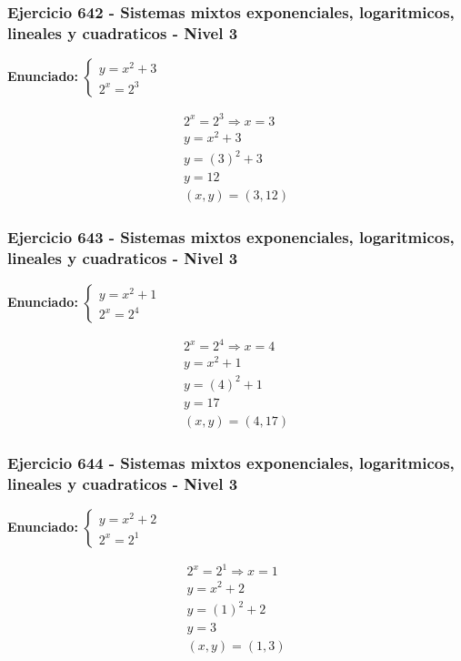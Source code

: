 \documentclass[12pt,a4paper]{article}
\begin{document}
\subsubsection*{Ejercicio 642 - Sistemas mixtos exponenciales, logaritmicos, lineales y cuadraticos - Nivel 3}
\textbf{Enunciado:} \(\begin{cases} y=x^2+3\\ 2^x=2^{3}\end{cases}\)

\[
\begin{aligned}
2^x=2^{3}\Rightarrow x=3\\
y=x^2+3\\
y=(3)^2+3\\
y=12\\
\boxed{(x,y)=(3,12)}
\end{aligned}
\]


\subsubsection*{Ejercicio 643 - Sistemas mixtos exponenciales, logaritmicos, lineales y cuadraticos - Nivel 3}
\textbf{Enunciado:} \(\begin{cases} y=x^2+1\\ 2^x=2^{4}\end{cases}\)

\[
\begin{aligned}
2^x=2^{4}\Rightarrow x=4\\
y=x^2+1\\
y=(4)^2+1\\
y=17\\
\boxed{(x,y)=(4,17)}
\end{aligned}
\]


\subsubsection*{Ejercicio 644 - Sistemas mixtos exponenciales, logaritmicos, lineales y cuadraticos - Nivel 3}
\textbf{Enunciado:} \(\begin{cases} y=x^2+2\\ 2^x=2^{1}\end{cases}\)

\[
\begin{aligned}
2^x=2^{1}\Rightarrow x=1\\
y=x^2+2\\
y=(1)^2+2\\
y=3\\
\boxed{(x,y)=(1,3)}
\end{aligned}
\]
\end{document}
